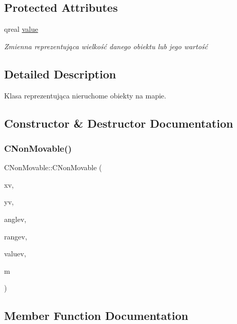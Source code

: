 \subsection*{Protected Attributes}
\begin{DoxyCompactItemize}
\item 
qreal \mbox{\hyperlink{class_c_non_movable_aaa6f737556a51a132b8cc89255b8c096}{value}}
\begin{DoxyCompactList}\small\item\em Zmienna reprezentująca wielkość danego obiektu lub jego wartość \end{DoxyCompactList}\end{DoxyCompactItemize}


\subsection{Detailed Description}
Klasa reprezentująca nieruchome obiekty na mapie. 

\subsection{Constructor \& Destructor Documentation}
\mbox{\label{class_c_non_movable_abe455ba26ac2d5b3eb5e99e7a282b9b7}} 
\subsubsection{\texorpdfstring{C\+Non\+Movable()}{CNonMovable()}}
{\footnotesize\ttfamily C\+Non\+Movable\+::\+C\+Non\+Movable (\begin{DoxyParamCaption}\item[{qreal}]{xv,  }\item[{qreal}]{yv,  }\item[{qreal}]{anglev,  }\item[{qreal}]{rangev,  }\item[{qreal}]{valuev,  }\item[{\mbox{\hyperlink{class_c_map}{C\+Map}} $\ast$}]{m }\end{DoxyParamCaption})}



\subsection{Member Function Documentation}
\mbox{\label{class_c_non_movable_a34204726d749b5eb66ed763119a46163}} 
